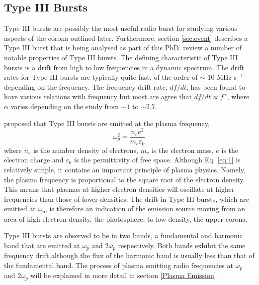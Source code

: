 \subsection{Type III Bursts}
\label{characteristics} %
Type III bursts are possibly the most useful radio burst for studying various aspects of the corona outlined later. Furthermore, section \ref{sec:event} describes a Type III burst that is being analysed as part of this PhD.
\cite{Reid2014} review a number of notable properties of Type III bursts. The defining characteristic of Type III bursts is a drift from high to low frequencies in a dynamic spectrum. The drift rates for Type III bursts are typically quite fast, of the order of $\sim$ 10 MHz s$^{-1}$ depending on the frequency. The frequency drift rate, $df/dt$, has been found to have various relations with frequency \citep{Reid2014} but most are agree that $df/dt \propto f^{\alpha}$, where $\alpha$ varies depending on the study from $\sim 1$ to $\sim 2.7$. 

\cite{Ginzburg1958} proposed that Type III bursts are emitted at the plasma frequency,
\begin{equation}\label{eq:1}
    \omega_{p}^2 = \frac{n_ee^2}{m_e \varepsilon_0}
\end{equation}
where $n_e$ is the number density of electrons, $m_e$ is the electron mass, $e$ is the electron charge and $\varepsilon_0$ is the permittivity of free space.
Although Eq. \ref{eq:1} is relatively simple, it contains an important principle of plasma physics. Namely, the plasma frequency is proportional to the square root of the electron density. This means that plasmas at higher electron densities will oscillate at higher frequencies than those of lower densities. The drift in Type III bursts, which are emitted at $\omega_p$, is therefore an indication of the emission source moving from an area of high electron density, the photosphere, to low density, the upper corona.

Type III bursts are observed to be in two bands, a fundamental and harmonic band that are emitted at $\omega_p$ and $2 \omega_p$ respectively. Both bands exhibit the same frequency drift although the flux of the harmonic band is usually less than that of the fundamental band. The process of plasma emitting radio frequencies at $\omega_p$ and $2 \omega_p$ will be explained in more detail in section \ref{Plasma Emission}. 

